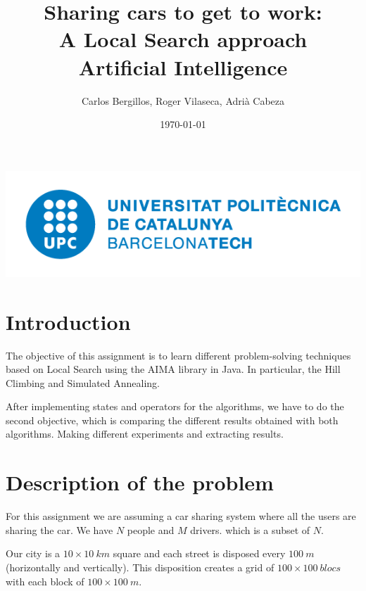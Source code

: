 \documentclass[12]{article}
\author{Carlos Bergillos, Roger Vilaseca, Adrià Cabeza}
\title{\textbf{Sharing cars to get to work:\\ A Local Search approach}\\ \bigskip Artificial Intelligence}
\date{\today}
\begin{document}
\maketitle
\vspace*{\fill}
\begin{center}
\includegraphics[scale=0.5]{images/UPClogo.png}
\end{center}
 
\newpage
\tableofcontents
\newpage
\section{Introduction}

The objective of this assignment is to learn different problem-solving techniques based on Local Search using the AIMA library in Java.
In particular, the Hill Climbing and Simulated Annealing.

After implementing states and operators for the algorithms, we have to do the second objective, which is comparing the different results obtained with both algorithms.
Making different experiments and extracting results.

\section{Description of the problem}

For this assignment we are assuming a car sharing system where all the users are sharing the car. We have $N$ people and $M$ drivers. which is a subset of $N$. 

Our city is a $10\times10\ km$ square and each street is disposed every $100\ m$ (horizontally and vertically). This disposition creates a grid of $100\times100\ blocs$ with each block of $100\times100\ m$.
\end{document}

